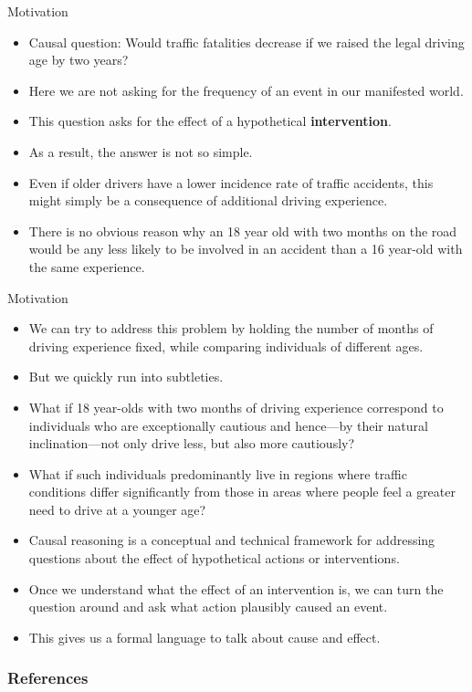 \documentclass[handout]{beamer}
\begin{document}
\begin{frame}{Motivation}
\scriptsize{
\begin{itemize}
\item Causal question:  Would traffic fatalities decrease if we raised the legal driving age by two years? 
\item Here we are not asking for the frequency of an event in our manifested world.
\item This question asks for the effect of a hypothetical \textbf{intervention}.
\item As a result, the answer is not so simple. 
\item Even if older drivers have a lower incidence rate of traffic accidents, this might simply be a consequence of additional driving experience. 
\item There is no obvious reason why an 18 year old with two months on the road would be any less likely to be involved in an accident than a 16 year-old with the same experience.


\end{itemize}

} 

\end{frame}



\begin{frame}{Motivation}
\scriptsize{
\begin{itemize}
\item We can try to address this problem by holding the number of months of driving experience fixed, while comparing individuals of different ages.
\item But we quickly run into subtleties.
\item What if 18 year-olds with two months of driving experience correspond to individuals who are exceptionally cautious and hence—by their natural inclination—not only drive less, but also more cautiously?
\item What if such individuals predominantly live in regions where traffic conditions differ significantly from those in areas where people feel a greater need to drive at a younger age?

\item  Causal reasoning is a conceptual and technical framework for addressing questions about the effect of hypothetical actions or interventions. 
\item Once we understand what the effect of an intervention is, we can turn the question around and ask what action plausibly caused an event. 
\item This gives us a formal language to talk about cause and effect.


\end{itemize}

} 

\end{frame}


\begin{frame}[allowframebreaks]\scriptsize
\frametitle{References}


%
\end{frame}  









\end{document}
